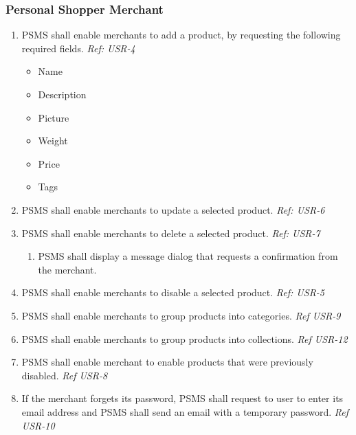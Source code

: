 \subsubsection{Personal Shopper Merchant}
\begin{enumerate}[resume, label=SY-\arabic*]
    \item PSMS shall enable merchants to add a product, by requesting the 
    following required fields.
    \newline \textit{Ref: USR-4}
    \begin{itemize}
        \item Name
        \item Description
        \item Picture
        \item Weight
        \item Price 
        \item Tags
    \end{itemize}
    \item PSMS shall enable merchants to update a selected product.
    \newline \textit{Ref: USR-6}
    \item PSMS shall enable merchants to delete a selected product.
    \newline \textit{Ref: USR-7}
    \begin{enumerate}[label=SY-24.\arabic*]
        \item PSMS shall display a message dialog that requests a confirmation 
        from the merchant.
    \end{enumerate}
    \item PSMS shall enable merchants to disable a selected product.
    \newline \textit{Ref: USR-5}
    \item PSMS shall enable merchants to group products into categories. 
    \newline \textit{Ref USR-9}
    \item PSMS shall enable merchants to group products into collections. 
    \newline \textit{Ref USR-12} 
    \item PSMS shall enable merchant to enable products that were 
    previously disabled.
    \newline \textit{Ref USR-8} 
    \item If the merchant forgets its password, PSMS shall request to user 
    to enter its email address and PSMS shall send an email with a 
    temporary password.
    \newline \textit{Ref USR-10} 
\end{enumerate}

